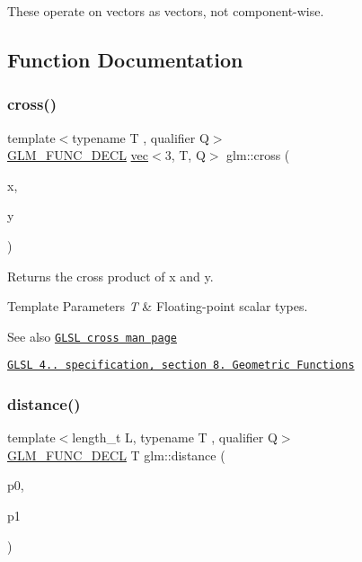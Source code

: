 These operate on vectors as vectors, not component-\/wise. 

\subsection{Function Documentation}
\mbox{\label{group__core__func__geometric_gaeeec0794212fe84fc9d261de067c9587}} 
\subsubsection{\texorpdfstring{cross()}{cross()}}
{\footnotesize\ttfamily template$<$typename T , qualifier Q$>$ \\
\mbox{\hyperlink{setup_8hpp_ab2d052de21a70539923e9bcbf6e83a51}{G\+L\+M\+\_\+\+F\+U\+N\+C\+\_\+\+D\+E\+CL}} \mbox{\hyperlink{structglm_1_1vec}{vec}}$<$3, T, Q$>$ glm\+::cross (\begin{DoxyParamCaption}\item[{\mbox{\hyperlink{structglm_1_1vec}{vec}}$<$ 3, T, Q $>$ const \&}]{x,  }\item[{\mbox{\hyperlink{structglm_1_1vec}{vec}}$<$ 3, T, Q $>$ const \&}]{y }\end{DoxyParamCaption})}

Returns the cross product of x and y.


\begin{DoxyTemplParams}{Template Parameters}
{\em T} & Floating-\/point scalar types.\\
\hline
\end{DoxyTemplParams}
\begin{DoxySeeAlso}{See also}
\href{http://www.opengl.org/sdk/docs/manglsl/xhtml/cross.xml}{\tt G\+L\+SL cross man page} 

\href{http://www.opengl.org/registry/doc/GLSLangSpec.4.20.8.pdf}{\tt G\+L\+SL 4.. specification, section 8. Geometric Functions} 
\end{DoxySeeAlso}
\mbox{\label{group__core__func__geometric_gaa68de6c53e20dfb2dac2d20197562e3f}} 
\subsubsection{\texorpdfstring{distance()}{distance()}}
{\footnotesize\ttfamily template$<$length\+\_\+t L, typename T , qualifier Q$>$ \\
\mbox{\hyperlink{setup_8hpp_ab2d052de21a70539923e9bcbf6e83a51}{G\+L\+M\+\_\+\+F\+U\+N\+C\+\_\+\+D\+E\+CL}} T glm\+::distance (\begin{DoxyParamCaption}\item[{\mbox{\hyperlink{structglm_1_1vec}{vec}}$<$ L, T, Q $>$ const \&}]{p0,  }\item[{\mbox{\hyperlink{structglm_1_1vec}{vec}}$<$ L, T, Q $>$ const \&}]{p1 }\end{DoxyParamCaption})}

